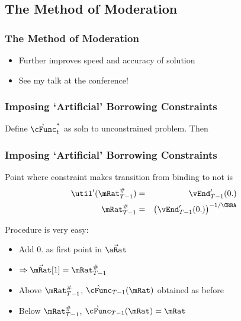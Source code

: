 \documentclass{beamer}
\begin{document}
\subsection{The Method of Moderation}

\begin{frame}[label=MoM]
\frametitle{The Method of Moderation}

\begin{itemize}
\item Further improves speed and accuracy of solution
\item See my talk at the conference!
\end{itemize}

\end{frame}

\begin{frame}
\frametitle{Imposing `Artificial' Borrowing Constraints}


\pause 

Define $\grave{\cFunc}^{*}_{t}$ as soln to unconstrained problem.  Then


\end{frame}

\begin{frame}
\frametitle{Imposing `Artificial' Borrowing Constraints}

Point where constraint makes transition from binding to not is
\begin{eqnarray*}
    \util^{\prime}(\mRat_{T-1}^{\#}) & = & \vEnd^{\prime}_{T-1}(0.)
\\  \mRat_{T-1}^{\#} & = & \left(\vEnd^{\prime}_{T-1}(0.)\right)^{-1/\CRRA}
\end{eqnarray*}
\pause\medskip

Procedure is very easy:
\begin{itemize}
\item Add $0.$ as first point in $\vec{\aRat}$
\item $\Rightarrow \vec{\mRat}[1] = \mRat_{T-1}^{\#}$
\item Above $\mRat_{T-1}^{\#}$, $\grave{\cFunc}_{T-1}(\mRat)$ obtained as before
\item Below $\mRat_{T-1}^{\#}$, $\grave{\cFunc}_{T-1}(\mRat)=\mRat$
\end{itemize}

\end{frame}
\end{document}

